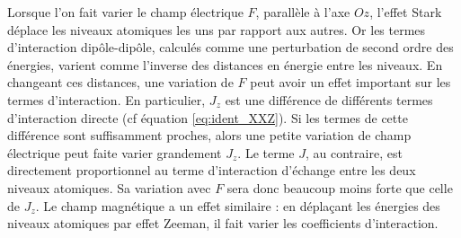 Lorsque l'on fait varier le champ électrique $F$, parallèle à l'axe $Oz$, l'effet Stark déplace les niveaux atomiques les uns par rapport aux autres.
Or les termes d'interaction dipôle-dipôle, calculés comme une perturbation de second ordre des énergies, varient comme l'inverse des distances en énergie entre les niveaux.
En changeant ces distances, une variation de $F$ peut avoir un effet important sur les termes d'interaction.
En particulier, $J_z$ est une différence de différents termes d'interaction directe (cf équation \eqref{eq:ident_XXZ}).
Si les termes de cette différence sont suffisamment proches, alors une petite variation de champ électrique peut faite varier grandement $J_z$. %
Le terme $J$, au contraire, est directement proportionnel au terme d'interaction d'échange entre les deux niveaux atomiques.
Sa variation avec $F$ sera donc beaucoup moins forte que celle de $J_z$.
Le champ magnétique a un effet similaire : en déplaçant les énergies des niveaux atomiques par effet Zeeman, il fait varier les coefficients d'interaction.

